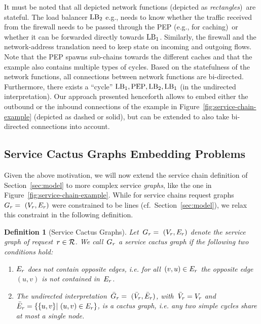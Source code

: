 \documentclass[10pt, conference, letterpaper]{IEEEtran}
\newtheorem{definition}[theorem]{Definition}
\begin{document}
 
It must be noted that all depicted network functions (depicted as \emph{rectangles})~are stateful. The load balancer $\textnormal{LB}_2$ e.g., needs to know whether the traffic received from the firewall needs to be passed through the PEP (e.g., for caching)~or whether it can be forwarded directly towards $\textnormal{LB}_1$. Similarly, the firewall and the network-address translation need to keep state on incoming and outgoing flows. Note that the PEP spawns sub-chains towards the different caches and that the example also contains multiple types of cycles. Based on the statefulness of the network functions, all connections between network functions are bi-directed. Furthermore, there exists a ``cycle'' $\textnormal{LB}_1, \textnormal{PEP}, \textnormal{LB}_2, \textnormal{LB}_1$ (in the undirected interpretation). Our approach presented henceforth allows to embed either the outbound or the inbound connections of the example in Figure~\ref{fig:service-chain-example} (depicted as dashed or solid), but can be extended to also take bi-directed connections into account.


 
\subsection{Service Cactus Graphs Embedding Problems}
 
\label{sec:cactus:service-cactus-graph-embedding-problems}
 
Given the above motivation, we will now extend the service chain definition of Section~\ref{sec:model} to more complex service \emph{graphs},
like the one in Figure~\ref{fig:service-chain-example}. While for service chains request graphs~$G_{r} =~(V_{r},E_{r})$ were constrained to be lines (cf.~Section~\ref{sec:model}), we relax this constraint in the following definition.
\begin{definition}[Service Cactus Graphs]
\label{def:service-cacti-graphs}
Let~$G_{r} =~(V_{r}, E_{r})$ denote the service graph of request~$r \in \mathcal{R}$. We call~$G_{r}$ a service cactus graph if the following two conditions hold:
\begin{enumerate}
\item$E_{r}$ does not contain opposite edges, i.e. for all~$(v,u) \in  E_{r}$ the opposite edge~$(u,v)$ is not contained in~$E_{r}$.
\item The undirected interpretation~$\bar{G}_{r} =~(\bar{V}_{r},\bar{E}_{r})$, with~$\bar{V}_{r} = V_{r}$ and~$\bar{E}_{r} = \{\{u,v\} |~(u,v) \in  E_{r}\}$, is a cactus graph, i.e. any two simple cycles share at most a single node.
\end{enumerate} 
\end{definition}
\end{document}
